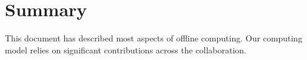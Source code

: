 \documentclass[../main-v1.tex]{subfiles}
\begin{document}
\section{Summary}

This document has described most aspects of  offline computing. Our computing model relies on significant contributions across the collaboration.  

\end{document}
